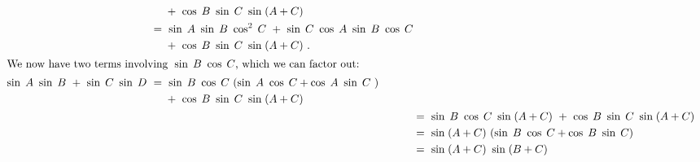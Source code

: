 \begin{exmp}
\begin{align*}
\begin{split}
  &\mathrel{\phantom{=}} {} +~ \cos\;B~\sin\;C~\sin\;(A+C)\\
  &=~ \sin\;A~\sin\;B~\cos^2 \;C ~+~ \sin\;C~\cos\;A~\sin\;B~\cos\;C\\
  &\mathrel{\phantom{=}} {} +~ \cos\;B~\sin\;C~\sin\;(A+C)~.\\
  \intertext{We now have two terms involving $\;\sin\;B~\cos\;C$, which we can factor out:}
  \sin\;A~\sin\;B ~+~ \sin\;C~\sin\;D ~
  &=~ \sin\;B~\cos\;C~(\sin\;A~\cos\;C + \cos\;A~\sin\;C~)\\
  &\mathrel{\phantom{=}} {} +~ \cos\;B~\sin\;C~\sin\;(A+C)\end{split}\\
  &=~ \sin\;B~\cos\;C~\sin\;(A+C) ~+~ \cos\;B~\sin\;C~\sin\;(A+C)\\
  &=~ \sin\;(A+C)~(\sin\;B~\cos\;C + \cos\;B~\sin\;C)\\
  &=~ \sin\;(A+C)~\sin\;(B+C)
 \end{align*}
\end{exmp}\vspace{-1mm}
